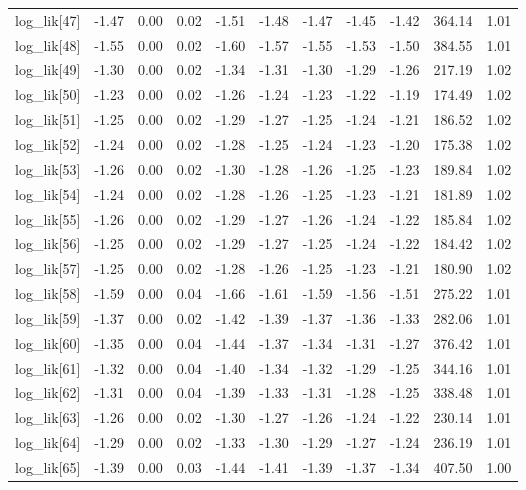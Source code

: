 \begin{table}[ht]
\begin{tabular}{rrrrrrrrrrr}
  log\_lik[47] & -1.47 & 0.00 & 0.02 & -1.51 & -1.48 & -1.47 & -1.45 & -1.42 & 364.14 & 1.01 \\ 
  log\_lik[48] & -1.55 & 0.00 & 0.02 & -1.60 & -1.57 & -1.55 & -1.53 & -1.50 & 384.55 & 1.01 \\ 
  log\_lik[49] & -1.30 & 0.00 & 0.02 & -1.34 & -1.31 & -1.30 & -1.29 & -1.26 & 217.19 & 1.02 \\ 
  log\_lik[50] & -1.23 & 0.00 & 0.02 & -1.26 & -1.24 & -1.23 & -1.22 & -1.19 & 174.49 & 1.02 \\ 
  log\_lik[51] & -1.25 & 0.00 & 0.02 & -1.29 & -1.27 & -1.25 & -1.24 & -1.21 & 186.52 & 1.02 \\ 
  log\_lik[52] & -1.24 & 0.00 & 0.02 & -1.28 & -1.25 & -1.24 & -1.23 & -1.20 & 175.38 & 1.02 \\ 
  log\_lik[53] & -1.26 & 0.00 & 0.02 & -1.30 & -1.28 & -1.26 & -1.25 & -1.23 & 189.84 & 1.02 \\ 
  log\_lik[54] & -1.24 & 0.00 & 0.02 & -1.28 & -1.26 & -1.25 & -1.23 & -1.21 & 181.89 & 1.02 \\ 
  log\_lik[55] & -1.26 & 0.00 & 0.02 & -1.29 & -1.27 & -1.26 & -1.24 & -1.22 & 185.84 & 1.02 \\ 
  log\_lik[56] & -1.25 & 0.00 & 0.02 & -1.29 & -1.27 & -1.25 & -1.24 & -1.22 & 184.42 & 1.02 \\ 
  log\_lik[57] & -1.25 & 0.00 & 0.02 & -1.28 & -1.26 & -1.25 & -1.23 & -1.21 & 180.90 & 1.02 \\ 
  log\_lik[58] & -1.59 & 0.00 & 0.04 & -1.66 & -1.61 & -1.59 & -1.56 & -1.51 & 275.22 & 1.01 \\ 
  log\_lik[59] & -1.37 & 0.00 & 0.02 & -1.42 & -1.39 & -1.37 & -1.36 & -1.33 & 282.06 & 1.01 \\ 
  log\_lik[60] & -1.35 & 0.00 & 0.04 & -1.44 & -1.37 & -1.34 & -1.31 & -1.27 & 376.42 & 1.01 \\ 
  log\_lik[61] & -1.32 & 0.00 & 0.04 & -1.40 & -1.34 & -1.32 & -1.29 & -1.25 & 344.16 & 1.01 \\ 
  log\_lik[62] & -1.31 & 0.00 & 0.04 & -1.39 & -1.33 & -1.31 & -1.28 & -1.25 & 338.48 & 1.01 \\ 
  log\_lik[63] & -1.26 & 0.00 & 0.02 & -1.30 & -1.27 & -1.26 & -1.24 & -1.22 & 230.14 & 1.01 \\ 
  log\_lik[64] & -1.29 & 0.00 & 0.02 & -1.33 & -1.30 & -1.29 & -1.27 & -1.24 & 236.19 & 1.01 \\ 
  log\_lik[65] & -1.39 & 0.00 & 0.03 & -1.44 & -1.41 & -1.39 & -1.37 & -1.34 & 407.50 & 1.00 \\ 

\end{tabular}
\end{table}
